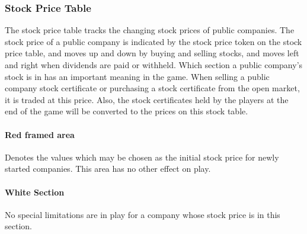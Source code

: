 \documentclass{article}
\begin{document}
\begin{CJK}{UTF8}{min}


\subsubsection{Stock Price Table}
The stock price table tracks the changing stock prices of public
companies. The stock price of a public company is indicated by the
stock price token on the stock price table, and moves up and down by
buying and selling stocks, and moves left and right when dividends are
paid or withheld. Which section a public company's stock is in has an
important meaning in the game. When selling a public company stock
certificate or purchasing a stock certificate from the open market, it
is traded at this price. Also, the stock certificates held by the
players at the end of the game will be converted to the prices on this
stock table.



\paragraph{Red framed area}
Denotes the values which may be chosen as the initial stock price for
newly started companies. This area has no other effect on play.



\paragraph{White Section}
No special limitations are in play for a company whose stock price is
in this section.



\end{CJK}
\end{document}
